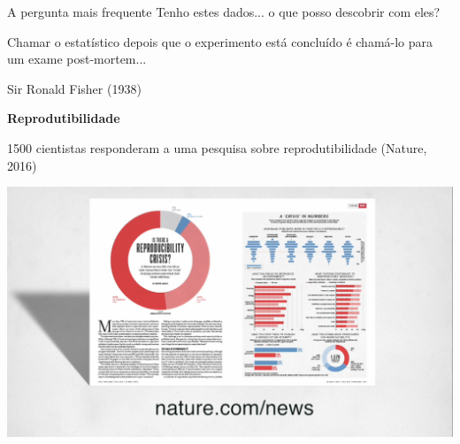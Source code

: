 \documentclass{beamer}
\begin{document}
\begin{frame}
  \begin{block}{A pergunta mais frequente}
    Tenho estes dados... o que posso descobrir com eles?
  \end{block}
\end{frame}

\begin{frame}
  \begin{block}{}
    Chamar o estatístico depois que o experimento está concluído é chamá-lo para um exame post-mortem...

\bigskip
{}
  \end{block}
\hfill Sir Ronald Fisher (1938)
\end{frame}

\begin{frame}
  \begin{center}
    {\bf Reprodutibilidade}
  \end{center}
\end{frame}

\begin{frame}
  1500 cientistas responderam a uma pesquisa sobre reprodutibilidade (Nature, 2016)

\includegraphics[width=\textwidth]{Imagens/reprod-nature3}
\end{frame}
\end{document}

